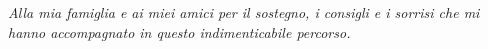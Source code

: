 %
\clearpage
{}
\begin{center}
  \begin{flushright}
    \begin{minipage}{.5\textwidth}
      \textit{Alla mia famiglia e ai miei amici per il sostegno, i consigli e i sorrisi
      che mi hanno accompagnato in questo indimenticabile percorso.}
    \end{minipage}
  \end{flushright}
\end{center}
\clearpage